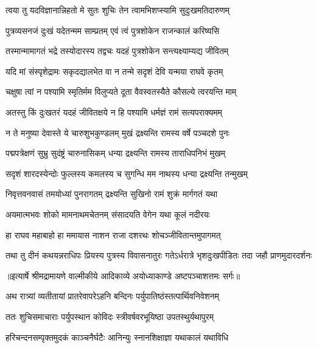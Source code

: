 \twolineshloka
{त्वया तु यदविज्ञानान्निहतो मे सुतः शुचिः}
{तेन त्वामभिशप्स्यामि सुदुःखमतिदारुणम्} %

\twolineshloka
{पुत्रव्यसनजं दुःखं यदेतन्मम साम्प्रतम्}
{एवं त्वं पुत्रशोकेन राजन्कालं करिष्यसि} %

\twolineshloka
{तस्मान्मामागतं भद्रे तस्योदारस्य तद्वचः}
{यदहं पुत्रशोकेन सन्त्यक्ष्याम्यद्य जीवितम्} %

\twolineshloka
{यदि मां संस्पृशेद्रामः सकृदद्यालभेत वा}
{न तन्मे सदृशं देवि यन्मया राघवे कृतम्} %

\twolineshloka
{चक्षुषा त्वां न पश्यामि स्मृतिर्मम विलुप्यते}
{दूता वैवस्वतस्यैते कौसल्ये त्वरयन्ति माम्} %

\twolineshloka
{अतस्तु किं दुःखतरं यदहं जीवितक्षये}
{न हि पश्यामि धर्मज्ञं रामं सत्यपराक्यमम्} %

\twolineshloka
{न ते मनुष्या देवास्ते ये चारुशुभकुण्डलम्}
{मुखं द्रक्ष्यन्ति रामस्य वर्षे पञ्चदशे पुनः} %

\twolineshloka
{पद्मपत्रेक्षणं सुभ्रु सुदंष्ट्रं चारुनासिकम्}
{धन्या द्रक्ष्यन्ति रामस्य ताराधिपनिभं मुखम्} %

\twolineshloka
{सदृशं शारदस्येन्दोः फुल्लस्य कमलस्य च}
{सुगन्धि मम नाथस्य धन्या द्रक्ष्यन्ति तन्मुखम्} %

\twolineshloka
{निवृत्तवनवासं तमयोध्यां पुनरागतम्}
{द्रक्ष्यन्ति सुखिनो रामं शुक्रं मार्गगतं यथा} %

\twolineshloka
{अयमात्मभवः शोको मामनाथमचेतनम्}
{संसादयति वेगेन यथा कूलं नदीरयः} %

\twolineshloka
{हा राघव महाबाहो हा ममायास नाशन}
{राजा दशरथः शोचञ्जीवितान्तमुपागमत्} %

\fourlineindentedshloka
{तथा तु दीनं कथयन्नराधिपः}
{प्रियस्य पुत्रस्य विवासनातुरः}
{गतेऽर्धरात्रे भृशदुःखपीडितः}
{तदा जहौ प्राणमुदारदर्शनः} %


{॥इत्यार्षे श्रीमद्रामायणे वाल्मीकीये आदिकाव्ये अयोध्याकाण्डे अष्टपञ्चाशत्तमः सर्गः॥}


\twolineshloka
{अथ रात्र्यां व्यतीतायां प्रातरेवापरेऽहनि}
{बन्दिनः पर्युपातिष्ठंस्तत्पार्थिवनिवेशनम्} %

\twolineshloka
{ततः शुचिसमाचाराः पर्युपस्थान कोविदः}
{स्त्रीवर्षवरभूयिष्ठा उपतस्थुर्यथापुरम्} %

\twolineshloka
{हरिचन्दनसम्पृक्तमुदकं काञ्चनैर्घटैः}
{आनिन्युः स्नानशिक्षाज्ञा यथाकालं यथाविधि} %

